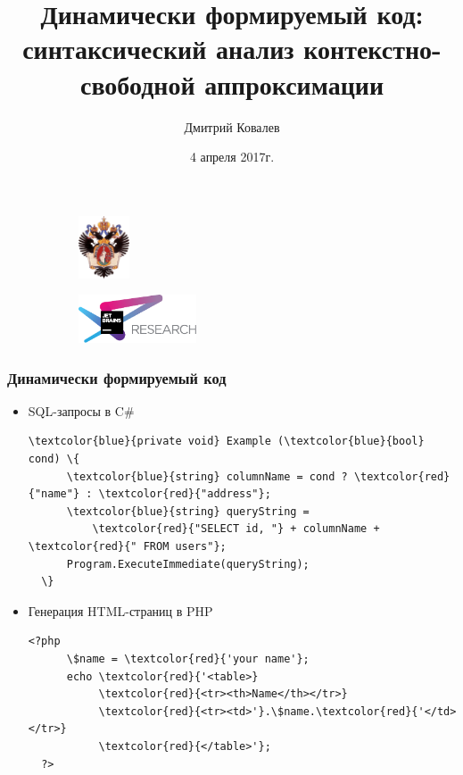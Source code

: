 \documentclass{beamer}
\title[]{Динамически формируемый код: синтаксический анализ контекстно-свободной аппроксимации}
\subtitle[]{}
\institute[СПбГУ]{
	Санкт-Петербургский государственный университет\\
	Лаборатория языковых инструментов JetBrains }
\author[Дмитрий Ковалев]{Дмитрий Ковалев}
\date{4 апреля 2017г.}
\begin{document}
{

\begin{frame}

\begin{figure}
	\centering
	\begin{subfigure}[h]{0.3\textwidth}
		\centering
		\includegraphics[width=1.5cm]{pictures/SPbGU_Logo.png}
	\end{subfigure}
	\begin{subfigure}[h]{0.3\textwidth}
		\centering
		\includegraphics[width=3.5cm]{pictures/jetbrains.pdf}
	\end{subfigure}
\end{figure}
\titlepage
\end{frame}
}

\begin{frame}[fragile]
	\transwipe[direction=90]
	\frametitle{Динамически формируемый код}
	\begin{itemize}
		\item SQL-запросы в C$\#$
			\begin{Verbatim}[commandchars=\\\{\}]
  \textcolor{blue}{private void} Example (\textcolor{blue}{bool} cond) \{
      \textcolor{blue}{string} columnName = cond ? \textcolor{red}{"name"} : \textcolor{red}{"address"};
      \textcolor{blue}{string} queryString = 
          \textcolor{red}{"SELECT id, "} + columnName + \textcolor{red}{" FROM users"};
      Program.ExecuteImmediate(queryString);
  \}
			\end{Verbatim}
		\pause
		\item Генерация HTML-страниц в PHP
			\begin{Verbatim}[commandchars=\\\{\}]	
  <?php 
      \$name = \textcolor{red}{'your name'};
      echo \textcolor{red}{'<table>} 
           \textcolor{red}{<tr><th>Name</th></tr>}  
           \textcolor{red}{<tr><td>'}.\$name.\textcolor{red}{'</td></tr>} 
           \textcolor{red}{</table>'};
  ?>
			\end{Verbatim}
	\end{itemize}
\end{frame}
\end{document}
